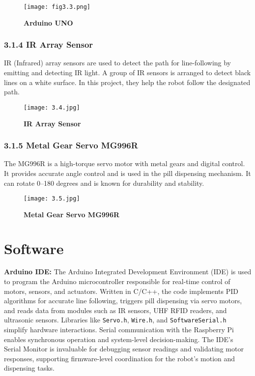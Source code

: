 \begin{figure}[H]
    \centering
    \texttt{[image: fig3.3.png]}
    \caption{\textbf{Arduino UNO}}
    \label{fig:3.3}
\end{figure}

\subsubsection*{3.1.4 IR Array Sensor}

IR (Infrared) array sensors are used to detect the path for line-following by emitting and detecting IR light. A group of IR sensors is arranged to detect black lines on a white surface. In this project, they help the robot follow the designated path.

\begin{figure}[H]
    \centering
    \texttt{[image: 3.4.jpg]}
    \caption{\textbf{IR Array Sensor}}
    \label{fig:3.4}
\end{figure}

\subsubsection*{3.1.5 Metal Gear Servo MG996R}

The MG996R is a high-torque servo motor with metal gears and digital control. It provides accurate angle control and is used in the pill dispensing mechanism. It can rotate 0–180 degrees and is known for durability and stability.

\begin{figure}[H]
    \centering
    \texttt{[image: 3.5.jpg]}
    \caption{\textbf{Metal Gear Servo MG996R}}
    \label{fig:3.5}
\end{figure}

\section{Software}

\textbf{Arduino IDE:} The Arduino Integrated Development Environment (IDE) is used to program the Arduino microcontroller responsible for real-time control of motors, sensors, and actuators. Written in C/C++, the code implements PID algorithms for accurate line following, triggers pill dispensing via servo motors, and reads data from modules such as IR sensors, UHF RFID readers, and ultrasonic sensors. Libraries like \texttt{Servo.h}, \texttt{Wire.h}, and \texttt{SoftwareSerial.h} simplify hardware interactions. Serial communication with the Raspberry Pi enables synchronous operation and system-level decision-making. The IDE’s Serial Monitor is invaluable for debugging sensor readings and validating motor responses, supporting firmware-level coordination for the robot’s motion and dispensing tasks.


